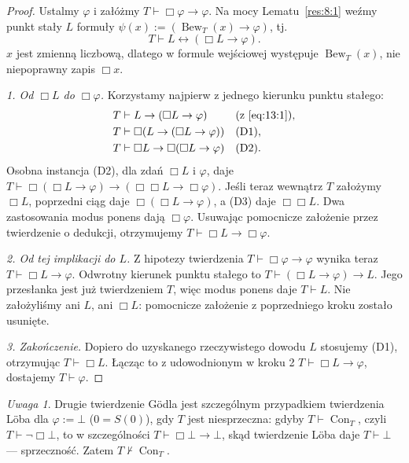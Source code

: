 \documentclass[11pt,a4paper]{article}
\numberwithin{equation}{section}
\theoremstyle{plain}
\theoremstyle{definition}
\theoremstyle{remark}
\newtheorem{uwaga}[twierdzenie]{Uwaga}
\begin{document}
\begin{proof}
Ustalmy $\varphi$ i załóżmy $T\vdash\Box\varphi\to\varphi$. Na mocy Lematu~\ref{res:8:1} weźmy punkt stały $L$ formuły $\psi(x):=(\operatorname{Bew}_T(x)\to\varphi)$, tj.
\begin{equation}\label{eq:13:1}
T\vdash L\leftrightarrow(\Box L\to\varphi).
\end{equation}
$x$ jest zmienną liczbową, dlatego w formule wejściowej występuje $\operatorname{Bew}_T(x)$, nie niepoprawny zapis $\Box x$.

\emph{1. Od $\Box L$ do $\Box\varphi$.} Korzystamy najpierw z jednego kierunku punktu stałego:
\begin{align*}
T&\vdash L\to(\Box L\to\varphi) &&\text{(z~\eqref{eq:13:1})},\\
T&\vdash\Box(L\to(\Box L\to\varphi)) &&\text{(D1)},\\
T&\vdash\Box L\to\Box(\Box L\to\varphi) &&\text{(D2)}.
\end{align*}
Osobna instancja (D2), dla zdań $\Box L$ i $\varphi$, daje $T\vdash\Box(\Box L\to\varphi)\to(\Box\Box L\to\Box\varphi)$. Jeśli teraz wewnątrz $T$ założymy $\Box L$, poprzedni ciąg daje $\Box(\Box L\to\varphi)$, a (D3) daje $\Box\Box L$. Dwa zastosowania modus ponens dają $\Box\varphi$. Usuwając pomocnicze założenie przez twierdzenie o dedukcji, otrzymujemy $T\vdash\Box L\to\Box\varphi$.

\emph{2. Od tej implikacji do $L$.} Z hipotezy twierdzenia $T\vdash\Box\varphi\to\varphi$ wynika teraz $T\vdash\Box L\to\varphi$. Odwrotny kierunek punktu stałego to $T\vdash(\Box L\to\varphi)\to L$. Jego przesłanka jest już twierdzeniem $T$, więc modus ponens daje $T\vdash L$. Nie założyliśmy ani $L$, ani $\Box L$: pomocnicze założenie z poprzedniego kroku zostało usunięte.

\emph{3. Zakończenie.} Dopiero do uzyskanego rzeczywistego dowodu $L$ stosujemy (D1), otrzymując $T\vdash\Box L$. Łącząc to z udowodnionym w kroku 2 $T\vdash\Box L\to\varphi$, dostajemy $T\vdash\varphi$.
\end{proof}

\begin{uwaga}\label{res:13:2}
Drugie twierdzenie Gödla jest szczególnym przypadkiem twierdzenia Löba dla $\varphi:=\bot$ ($0=S(0)$), gdy $T$ jest niesprzeczna: gdyby $T\vdash\operatorname{Con}_T$, czyli $T\vdash\neg\Box\bot$, to w szczególności $T\vdash\Box\bot\to\bot$, skąd twierdzenie Löba daje $T\vdash\bot$ --- sprzeczność. Zatem $T\nvdash\operatorname{Con}_T$.
\end{uwaga}
\end{document}
